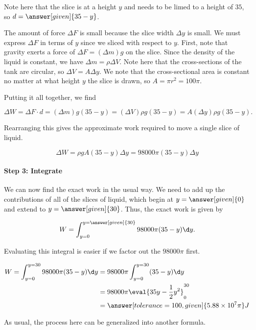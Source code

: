 \documentclass{ximera}
\begin{document}
\begin{model}
\begin{explanation}
Note here that the slice is at a height $y$ and needs to be limed to a height of $35$, so $d=\answer[given]{35-y}$.  

The amount of force $\Delta F$ is small because the slice width $\Delta y$ is small.  We must express $\Delta F$ in terms of $y$ since we sliced with respect to $y$.  First, note that gravity exerts a force of $\Delta F = (\Delta m) g $ on the slice.  Since the density of the liquid is constant, we have $\Delta m = \rho \Delta V$.  Note here that the cross-sections of the tank are circular, so $\Delta V = A \Delta y$.  We note that the cross-sectional area is constant no matter at what height $y$ the slice is drawn, so $A = \pi r^2 = 100 \pi$.

Putting it all together, we find

\[ \Delta W = \Delta F \cdot d = (\Delta m) g (35-y) = (\Delta V) \rho g (35-y) = A (\Delta y) \rho g (35-y) . \]

Rearranging this gives the approximate work required to move a single slice of liquid.

\[
\Delta W = \rho g A (35-y) \Delta y = 98000 \pi (35-y) \Delta y
\]

\paragraph{Step 3: Integrate} 

We can now find the exact work in the usual way.  We need to add up the contributions of all of the slices of liquid, which begin at $y=\answer[given]{0}$ and extend to $y=\answer[given]{30}$.  Thus, the exact work is given by

\[ W = \int_{y=0}^{y= \answer[given]{30}} 98000\pi(35-y) \d y. \]

Evaluating this integral is easier if we factor out the $98000\pi$ first.

\begin{align*}
W = \int_{y=0}^{y= 30} 98000\pi(35-y) \d y &= 98000\pi  \int_{y=0}^{y= 30} (35-y) \d y\\
&= 98000\pi \eval{35y-\frac{1}{2}y^2}_0^{30} \\
&= \answer[tolerance=100,given]{ 5.88 \times 10^7 \pi} J
\end{align*}
\end{explanation}

\end{model}

As usual, the process here can be generalized into another formula.  
\end{document}
